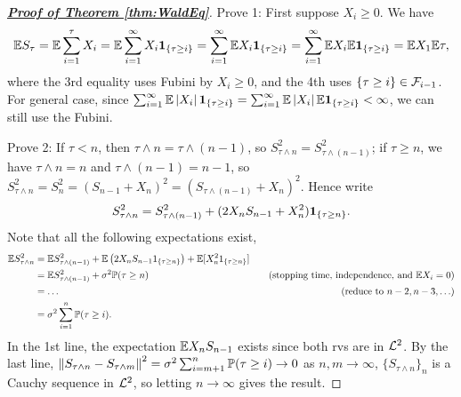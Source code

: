 \documentclass[10pt,a4paper]{article}
\begin{document}
\begin{proof}[\underline{\textbf{Proof of Theorem \ref{thm:WaldEq}}}]
	Prove 1: First suppose $X_i\geq 0$. We have 
	\begin{equation*}
		\mathbb E S_{\tau} = \mathbb E \sum_{i=1}^{\tau} X_i = \mathbb E \sum_{i=1}^{\infty } X_i {\boldsymbol 1}_{\{\tau\geq i\}} = \sum_{i=1}^{\infty }\mathbb E X_i{\boldsymbol 1}_{\{\tau\geq i\}} = \sum_{i=1}^{\infty }\mathbb E X_i \mathbb E {\boldsymbol 1}_{\{\tau\geq i\}} = \mathbb E X_1 \mathbb E \tau,
	\end{equation*} 
	where the 3rd equality uses Fubini by $X_i\geq 0$, and the 4th uses $\{\tau\geq i\}\in {\cal F}_{i-1}$. For general case, since $ \sum_{i=1}^{\infty }\mathbb E \left\lvert X_i\right\rvert{\boldsymbol 1}_{\{\tau\geq i\}}=\sum_{i=1}^{\infty }\mathbb E\left\lvert X_i\right\rvert\mathbb E{\boldsymbol 1}_{\{\tau\geq i\}}< \infty $, we can still use the Fubini. 

	Prove 2: If $\tau<n$, then $\tau\wedge n=\tau\wedge(n-1)$, so $S_{\tau\wedge n}^2=S_{\tau\wedge (n-1)}^2$; if $\tau\geq n$, we have $\tau\wedge n=n$ and $\tau\wedge(n-1)=n-1$, so $S_{\tau\wedge n}^2=S_n^2=(S_{n-1}+X_{n})^2=(S_{\tau\wedge(n-1)}+X_{n})^2$. Hence write
	\begin{equation*}
		S_{\tau\wedge n}^2=S_{\tau\wedge(n-1)}^2+(2X_nS_{n-1}+X_n^2){\boldsymbol 1}_{\{\tau\geq n\}}.
	\end{equation*}  
	Note that all the following expectations exist,
	\begin{equation*}
		\begin{aligned}
			\mathbb E S_{\tau\wedge n}^{2}& =\mathbb E S_{\tau\wedge(n-1)}^{2}+\mathbb E \left(2X_{n}S_{n-1}1_{\{\tau\geq n\}}\right)+\mathbb E [X_{n}^{2}1_{\{\tau\geq n\}}] \\
			&=\mathbb E S_{\tau\wedge(n-1)}^{2}+\sigma^{2}\mathbb P (\tau\geq n) & \quad (\text{stopping time, independence, and } \mathbb E X_i=0) \\
			&=\ldots & (\mathrm{reduce~to~}n-2,n-3,\ldots) \\
			&=\sigma^2\sum_{i=1}^n\mathbb P(\tau\geq i).
			\end{aligned}
	\end{equation*}
	In the 1st line, the expectation $\mathbb E X_n S_{n-1}$ exists since both rvs are in ${\cal L}^2$. By the last line, $\left\lVert S_{\tau\wedge n}-S_{\tau\wedge m}\right\rVert^2=\sigma^2\sum_{i=m+1}^{n}\mathbb P (\tau\geq i)\to 0$ as $n,m\to \infty $, $\{S_{\tau\wedge n}\}_{n}$ is a Cauchy sequence in ${\cal L}^2$, so letting $n\to \infty $  gives the result. 
\end{proof}
\end{document}
